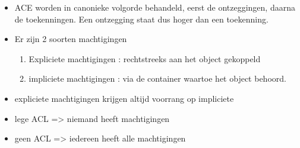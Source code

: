 \begin{itemize}
\item ACE worden in canonieke volgorde behandeld, eerst de ontzeggingen, daarna de toekenningen. Een ontzegging staat dus hoger dan een toekenning.
\item Er zijn 2 soorten machtigingen
\begin{enumerate}
\item Expliciete machtigingen : rechtstreeks aan het object gekoppeld
\item impliciete machtigingen : via de container waartoe het object behoord.
\end{enumerate}
\item expliciete machtigingen krijgen altijd voorrang op impliciete
\item lege ACL => niemand heeft machtigingen
\item geen ACL => iedereen heeft alle machtigingen
\end{itemize}

